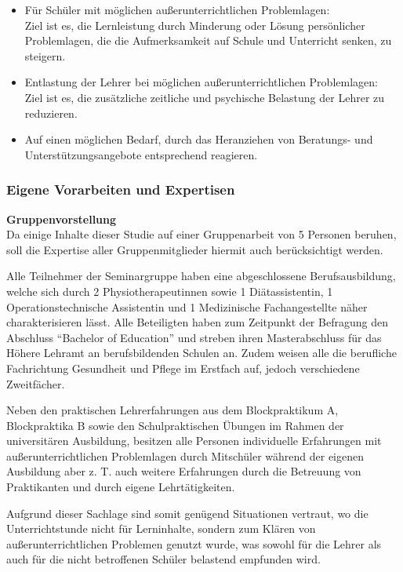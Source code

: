 \begin{itemize}
	\item Für Schüler mit möglichen außerunterrichtlichen Problemlagen:
	\\
	Ziel ist es, die Lernleistung durch Minderung oder Lösung persönlicher Problemlagen, die die Aufmerksamkeit auf Schule und Unterricht senken, zu steigern.
	\item Entlastung der Lehrer bei möglichen außerunterrichtlichen Problemlagen:
	 \\
	Ziel ist es, die zusätzliche zeitliche und psychische Belastung der Lehrer zu reduzieren. 
	\item Auf einen möglichen Bedarf, durch das Heranziehen von Beratungs- und Unterstützungsangebote entsprechend reagieren.
\end{itemize}

\newpage
\subsubsection{Eigene Vorarbeiten und Expertisen}
\label{sec:EigeneVorarbeitenUndExpertisen}

\noindent
\textbf{Gruppenvorstellung}\\

Da einige Inhalte dieser Studie auf einer Gruppenarbeit von 5 Personen beruhen, soll die Expertise aller Gruppenmitglieder hiermit auch berücksichtigt werden.

Alle Teilnehmer der Seminargruppe haben eine abgeschlossene Berufsausbildung, welche sich durch 2 Physiotherapeutinnen sowie 1 Diätassistentin, 1 Operationstechnische Assistentin und 1 Medizinische Fachangestellte näher charakterisieren lässt. Alle Beteiligten haben zum Zeitpunkt der Befragung den Abschluss "`Bachelor of Education"' und streben ihren Masterabschluss für das Höhere Lehramt an berufsbildenden Schulen an. Zudem weisen alle die berufliche Fachrichtung Gesundheit und Pflege im Erstfach auf, jedoch verschiedene Zweitfächer.

Neben den praktischen Lehrerfahrungen aus dem Blockpraktikum A, Blockpraktika B sowie den Schulpraktischen Übungen im Rahmen der universitären Ausbildung, besitzen alle Personen individuelle Erfahrungen mit außerunterrichtlichen Problemlagen durch Mitschüler während der eigenen Ausbildung aber z. T. auch weitere Erfahrungen durch die Betreuung von Praktikanten und durch eigene Lehrtätigkeiten.

Aufgrund dieser Sachlage sind somit genügend Situationen vertraut, wo die Unterrichtstunde nicht für Lerninhalte, sondern zum Klären von außerunterrichtlichen Problemen genutzt wurde, was sowohl für die Lehrer als auch für die nicht betroffenen Schüler belastend empfunden wird.

